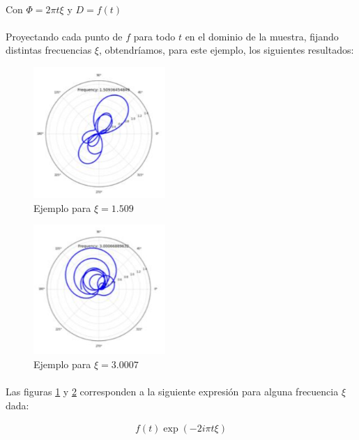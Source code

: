 \documentclass[12pt, twocolumn]{article}
\begin{document}
	\paragraph{} Con $\Phi=2\pi t\xi$ y $D=f(t)$

	\paragraph{} Proyectando cada punto de $f$ para todo $t$ en el dominio de la muestra, fijando distintas frecuencias $\xi$, obtendríamos, para este ejemplo, los siguientes resultados:
	
	\begin{figure}[H]
		\centering
		\includegraphics[width=5cm]{f1-5.png}
		\caption{Ejemplo para $\xi = 1.509$ }
		\label{f1-5}
	\end{figure}
	
	\begin{figure}[H]
		\centering
		\includegraphics[width=5cm]{f3-0.png}
		\caption{Ejemplo para $\xi = 3.0007$ }
		\label{f3-0}
	\end{figure}
	
	\paragraph{} Las figuras \ref{f1-5} y \ref{f3-0} corresponden a la siguiente expresión para alguna frecuencia $\xi$ dada:
	
	\begin{align}
		f(t)\exp(-2i\pi t \xi)
	\end{align}
	
\end{document}
